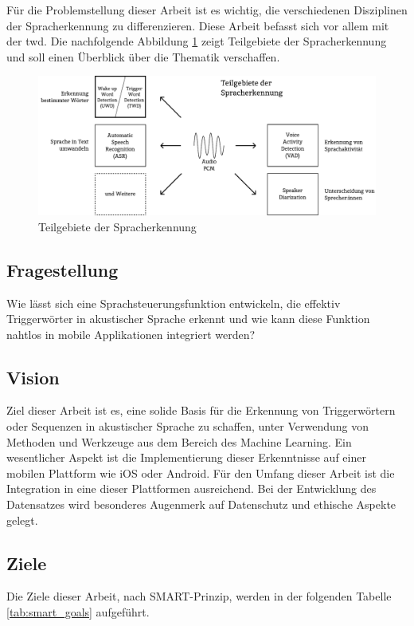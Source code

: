 \documentclass[11pt,a4paper]{article}
\begin{document}
\noindent \newline
Für die Problemstellung dieser Arbeit ist es wichtig, die verschiedenen Disziplinen der
Spracherkennung zu differenzieren. Diese Arbeit befasst sich vor allem mit der \gls{twd}. Die 
nachfolgende Abbildung \ref{fig:asr_twd} zeigt Teilgebiete der Spracherkennung und soll 
einen Überblick über die Thematik verschaffen. 

\vspace{1em}
\begin{figure}[h]
	\centering
	\includegraphics[width=1.0\linewidth]{img/asr_twd.pdf}
	\caption{Teilgebiete der Spracherkennung}
	\label{fig:asr_twd}

\end{figure}

\subsection{Fragestellung}
Wie lässt sich eine Sprachsteuerungsfunktion entwickeln, die effektiv Triggerwörter in akustischer 
Sprache erkennt und wie kann diese Funktion nahtlos in mobile Applikationen integriert werden?


\subsection{Vision}
Ziel dieser Arbeit ist es, eine solide Basis für die Erkennung von Triggerwörtern oder Sequenzen in 
akustischer Sprache zu schaffen, unter Verwendung von Methoden und Werkzeuge aus dem Bereich des 
Machine Learning. Ein wesentlicher Aspekt ist die Implementierung dieser Erkenntnisse auf einer 
mobilen Plattform wie iOS oder Android. Für den Umfang dieser Arbeit ist die Integration in eine 
dieser Plattformen ausreichend. Bei der Entwicklung des Datensatzes wird besonderes Augenmerk auf 
Datenschutz und ethische Aspekte gelegt.

\subsection{Ziele}
Die Ziele dieser Arbeit, nach SMART-Prinzip, werden in der folgenden Tabelle \ref{tab:smart_goals} 
aufgeführt.
\end{document}
